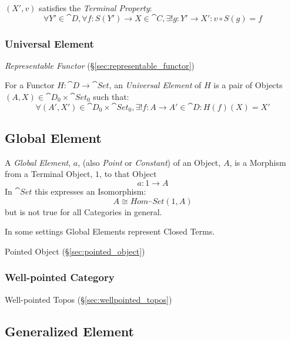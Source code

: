 $(X',v)$ satisfies the \emph{Terminal Property}:
\[
  \forall Y' \in \cat{D}, \forall f : S(Y') \rightarrow X \in
  \cat{C}, \exists! g : Y' \rightarrow X' : v \circ S(g) = f
\]




\subsubsection{Universal Element}\label{sec:universal_element}

\emph{Representable Functor} (\S\ref{sec:representable_functor})

For a Functor $H : \cat{D} \rightarrow \cat{Set}$, an
\emph{Universal Element} of $H$ is a pair of Objects $(A,X) \in
\cat{D}_0 \times \cat{Set}_0$ such that:
\[
  \forall (A',X') \in \cat{D}_0 \times \cat{Set}_0,
  \exists! f : A \rightarrow A' \in \cat{D} : H(f)(X) = X'
\]



\subsection{Global Element}\label{sec:global_element}

A \emph{Global Element}, $a$, (also \emph{Point} or \emph{Constant})
of an Object, $A$, is a Morphism from a Terminal Object, $1$, to that
Object
\[
  a: 1 \rightarrow A
\]
In $\cat{Set}$ this expresses an Isomorphism:
\[
  A \cong Hom_\cat{Set}(1,A)
\]
but is not true for all Categories in general.

In some settings Global Elements represent Closed Terms.

Pointed Object (\S\ref{sec:pointed_object})



\subsubsection{Well-pointed Category}\label{sec:well_pointed}

Well-pointed Topos (\S\ref{sec:wellpointed_topos})



\subsection{Generalized Element}\label{sec:generalized_element}

